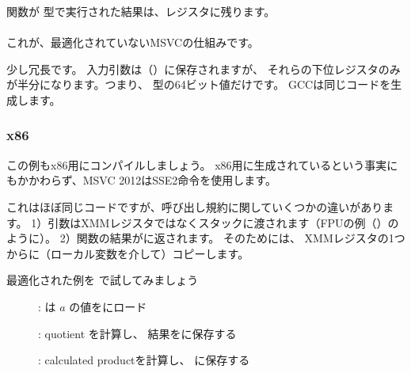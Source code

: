 関数が \Tdouble 型で実行された結果は、レジスタに残ります。\\
\\
これが、最適化されていないMSVCの仕組みです。



少し冗長です。 
入力引数は（）に保存されますが、
それらの下位レジスタのみが半分になります。つまり、 \Tdouble 型の64ビット値だけです。 
GCCは同じコードを生成します。

\subsubsection{x86}

この例もx86用にコンパイルしましょう。 x86用に生成されているという事実にもかかわらず、MSVC 2012はSSE2命令を使用します。





これはほぼ同じコードですが、呼び出し規約に関していくつかの違いがあります。
1）引数はXMMレジスタではなくスタックに渡されます（FPUの例（）のように）。 
2）関数の結果がに返されます。 そのためには、
XMMレジスタの1つからに（ローカル変数を介して）コピーします。

\clearpage
最適化された例を \olly で試してみましょう

\begin{figure}[H]
\centering
{}
\caption{\olly:  は $a$ の値をにロード}
\label{fig:FPU_SIMD_simple_olly1}
\end{figure}

\clearpage
\begin{figure}[H]
\centering
{}
\caption{\olly:  \gls{quotient} を計算し、
結果をに保存する}
\label{fig:FPU_SIMD_simple_olly2}
\end{figure}

\clearpage
\begin{figure}[H]
\centering
{}
\caption{\olly:  calculated \gls{product}を計算し、
に保存する}
\label{fig:FPU_SIMD_simple_olly3}
\end{figure}

